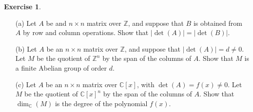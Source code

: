 \documentclass{amsart}
\newcommand{\C}         {{\mathbb{C}}}
\newcommand{\Z}         {{\mathbb{Z}}}
\newcommand{\tm}        {\times}
\newcommand{\ip}[1]     {\langle #1\rangle}
\renewcommand{\:}{\colon}
\theoremstyle{definition}
\newtheorem{exercise}{Exercise}[section]
\begin{document}
\begin{exercise}
 \begin{itemize}
  \item[(a)] Let $A$ be and $n\tm n$ matrix over $\Z$, and suppose
   that $B$ is obtained from $A$ by row and column operations.  Show
   that $|\det(A)|=|\det(B)|$.  
  \item[(b)] Let $A$ be an $n\tm n$ matrix over $\Z$, and suppose
   that $|\det(A)|=d\neq 0$.  Let $M$ be the quotient of $\Z^n$ by the
   span of the columns of $A$.  Show that $M$ is a finite Abelian
   group of order $d$.
  \item[(c)] Let $A$ be an $n\tm n$ matrix over $\C[x]$, with
   $\det(A)=f(x)\neq 0$.  Let $M$ be the quotient of $\C[x]^n$ by the
   span of the columns of $A$.  Show that $\dim_\C(M)$ is the degree
   of the polynomial $f(x)$.
 \end{itemize}
\end{exercise}
\end{document}
